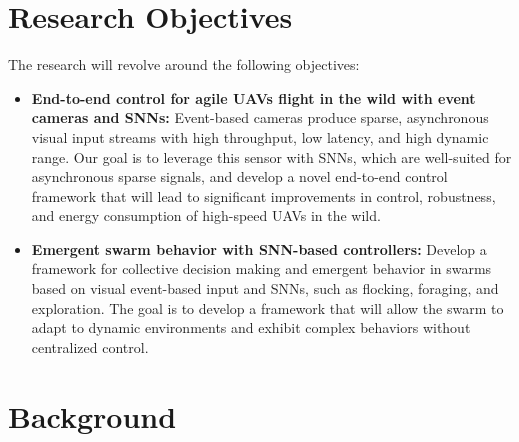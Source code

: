 \documentclass{article}
\begin{document}
\section{Research Objectives}
The research will revolve around the following objectives:    
\begin{itemize}
    \item \textbf{End-to-end control for agile UAVs flight in the wild with event cameras and SNNs:}
    Event-based cameras produce sparse, asynchronous visual input streams with high throughput, low latency, and high dynamic range. Our goal is to leverage this sensor with SNNs, which are well-suited for asynchronous sparse signals, and develop a novel end-to-end control framework that will lead to significant improvements in control, robustness, and energy consumption of high-speed UAVs in the wild.
          
            
    \item \textbf{Emergent swarm behavior with SNN-based controllers:}
    Develop a framework for collective decision making and emergent behavior in swarms based on visual event-based input and SNNs, such as flocking, foraging, and exploration. The goal is to develop a framework that will allow the swarm to adapt to dynamic environments and exhibit complex behaviors without centralized control.
\end{itemize}

\section{Background}
\end{document}
